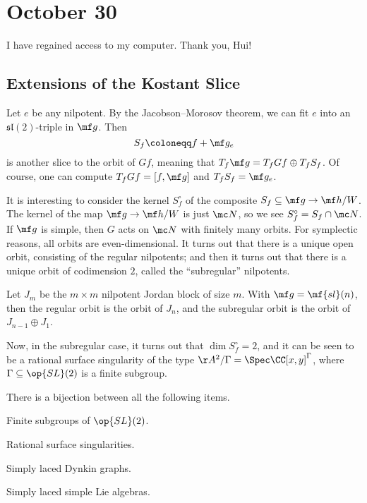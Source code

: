 \documentclass[../notes.tex]{subfiles}
\begin{document}
\section{October 30}
I have regained access to my computer. Thank you, Hui!

\subsection{Extensions of the Kostant Slice}
Let $e$ be any nilpotent. By the Jacobson--Morosov theorem, we can fit $e$ into an $\mathfrak{sl}(2)$-triple in $\mf g$. Then
\[S_f\coloneqq f+\mf g_e\]
is another slice to the orbit of $Gf$, meaning that $T_f\mf g=T_fGf\oplus T_fS_f$. Of course, one can compute $T_fGf=[f,\mf g]$ and $T_fS_f=\mf g_e$.

It is interesting to consider the kernel $S_f^\circ$ of the composite $S_f\subseteq\mf g\to\mf h/W$. The kernel of the map $\mf g\to\mf h/W$ is just $\mc N$, so we see $S_f^\circ=S_f\cap\mc N$. If $\mf g$ is simple, then $G$ acts on $\mc N$ with finitely many orbits. For symplectic reasons, all orbits are even-dimensional. It turns out that there is a unique open orbit, consisting of the regular nilpotents; and then it turns out that there is a unique orbit of codimension $2$, called the ``subregular'' nilpotents.
\begin{example}
	Let $J_m$ be the $m\times m$ nilpotent Jordan block of size $m$. With $\mf g=\mf{sl}(n)$, then the regular orbit is the orbit of $J_n$, and the subregular orbit is the orbit of $J_{n-1}\oplus J_1$.
\end{example}
Now, in the subregular case, it turns out that $\dim S_f^\circ=2$, and it can be seen to be a rational surface singularity of the type $\AA^2/\Gamma=\Spec\CC[x,y]^\Gamma$, where $\Gamma\subseteq\op{SL}(2)$ is a finite subgroup.
\begin{theorem}
	There is a bijection between all the following items.
	\begin{listroman}
		\item Finite subgroups of $\op{SL}(2)$.
		\item Rational surface singularities.
		\item Simply laced Dynkin graphs.
		\item Simply laced simple Lie algebras.
	\end{listroman}
\end{theorem}
\end{document}
